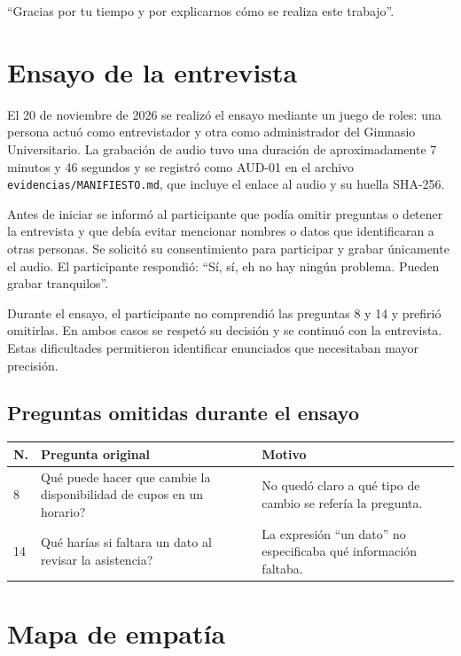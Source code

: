 \documentclass[11pt,a4paper]{article}
\begin{document}
``Gracias por tu tiempo y por explicarnos cómo se realiza este trabajo''.

\section{Ensayo de la entrevista}

El 20 de noviembre de 2026 se realizó el ensayo mediante un juego de roles:
una persona actuó como entrevistador y otra como administrador del Gimnasio
Universitario. La grabación de audio tuvo una duración de aproximadamente
7 minutos y 46 segundos y se registró como AUD-01 en el archivo
\texttt{evidencias/MANIFIESTO.md}, que incluye el enlace al audio y su huella
SHA-256.

Antes de iniciar se informó al participante que podía omitir preguntas o
detener la entrevista y que debía evitar mencionar nombres o datos que
identificaran a otras personas. Se solicitó su consentimiento para participar
y grabar únicamente el audio. El participante respondió:
``Sí, sí, eh no hay ningún problema. Pueden grabar tranquilos''.

Durante el ensayo, el participante no comprendió las preguntas 8 y 14 y
prefirió omitirlas. En ambos casos se respetó su decisión y se continuó con
la entrevista. Estas dificultades permitieron identificar enunciados que
necesitaban mayor precisión.

\subsection*{Preguntas omitidas durante el ensayo}

\begingroup
\renewcommand{\arraystretch}{1.25}
\begin{tabular}{@{}p{0.8cm}p{8cm}p{6.8cm}@{}}
\hline
\textbf{N.} & \textbf{Pregunta original} & \textbf{Motivo} \\
\hline
8 & \textquestiondown{}Qué puede hacer que cambie la disponibilidad de cupos en un horario?
& No quedó claro a qué tipo de cambio se refería la pregunta. \\
14 & \textquestiondown{}Qué harías si faltara un dato al revisar la asistencia?
& La expresión ``un dato'' no especificaba qué información faltaba. \\
\hline
\end{tabular}
\endgroup

\newpage
\section{Mapa de empatía}
\end{document}
